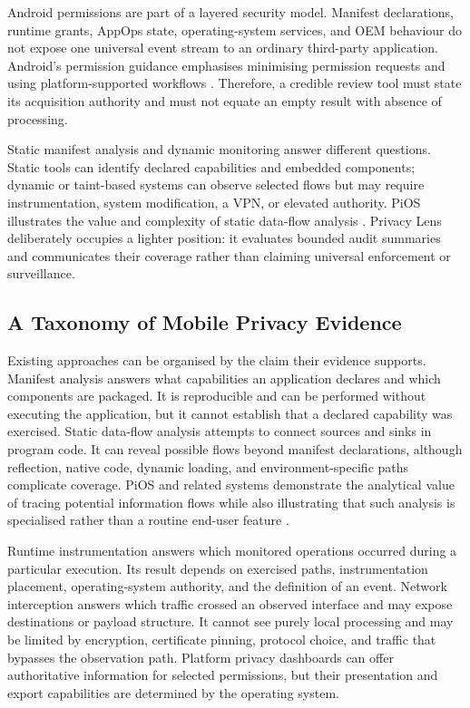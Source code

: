 Android permissions are part of a layered security model. Manifest declarations, runtime grants, AppOps state, operating-system services, and OEM behaviour do not expose one universal event stream to an ordinary third-party application. Android's permission guidance emphasises minimising permission requests and using platform-supported workflows \cite{androidPermissions}. Therefore, a credible review tool must state its acquisition authority and must not equate an empty result with absence of processing.

Static manifest analysis and dynamic monitoring answer different questions. Static tools can identify declared capabilities and embedded components; dynamic or taint-based systems can observe selected flows but may require instrumentation, system modification, a VPN, or elevated authority. PiOS illustrates the value and complexity of static data-flow analysis \cite{egele2011}. Privacy Lens deliberately occupies a lighter position: it evaluates bounded audit summaries and communicates their coverage rather than claiming universal enforcement or surveillance.

\subsection{A Taxonomy of Mobile Privacy Evidence}

Existing approaches can be organised by the claim their evidence supports. Manifest analysis answers what capabilities an application declares and which components are packaged. It is reproducible and can be performed without executing the application, but it cannot establish that a declared capability was exercised. Static data-flow analysis attempts to connect sources and sinks in program code. It can reveal possible flows beyond manifest declarations, although reflection, native code, dynamic loading, and environment-specific paths complicate coverage. PiOS and related systems demonstrate the analytical value of tracing potential information flows while also illustrating that such analysis is specialised rather than a routine end-user feature \cite{egele2011}.

Runtime instrumentation answers which monitored operations occurred during a particular execution. Its result depends on exercised paths, instrumentation placement, operating-system authority, and the definition of an event. Network interception answers which traffic crossed an observed interface and may expose destinations or payload structure. It cannot see purely local processing and may be limited by encryption, certificate pinning, protocol choice, and traffic that bypasses the observation path. Platform privacy dashboards can offer authoritative information for selected permissions, but their presentation and export capabilities are determined by the operating system.

